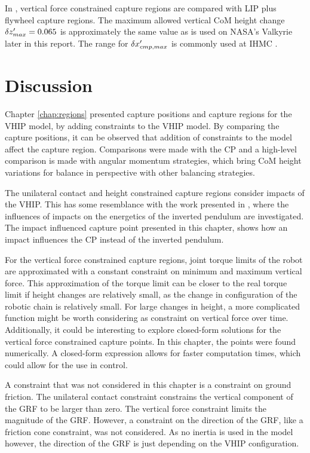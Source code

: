 In , vertical force constrained capture regions are compared with \ac{LIP} plus flywheel capture regions. The maximum allowed vertical \ac{CoM} height change $\delta z_{max}' =0.065$ is approximately the same value as is used on NASA's Valkyrie later in this report. The range for $\delta x_{cmp,max}'$ is commonly used at \ac{IHMC} \cite{griffin2017natural}.

\section{Discussion}
Chapter \ref{chap:regions} presented capture positions and capture regions for the \acf{VHIP} model, by adding constraints to the \ac{VHIP} model. By comparing the capture positions, it can be observed that addition of constraints to the model affect the capture region. Comparisons were made with the \ac{CP} and a high-level comparison is made with angular momentum strategies, which bring \ac{CoM} height variations for balance in perspective with other balancing strategies.

The unilateral contact and height constrained capture regions consider impacts of the \ac{VHIP}. This has some resemblance with the work presented in \cite{kuo2005energetic}, where the influences of impacts on the energetics of the inverted pendulum are investigated. The impact influenced capture point presented in this chapter, shows how an impact influences the \ac{CP} instead of the inverted pendulum.

For the vertical force constrained capture regions, joint torque limits of the robot are approximated with a constant constraint on minimum and maximum vertical force. This approximation of the torque limit can be closer to the real torque limit if height changes are relatively small, as the change in configuration of the robotic chain is relatively small. For large changes in height, a more complicated function might be worth considering as constraint on vertical force over time. Additionally, it could be interesting to explore closed-form solutions for the vertical force constrained capture points. In this chapter, the points were found numerically. A closed-form expression allows for faster computation times, which could allow for the use in control.

A constraint that was not considered in this chapter is a constraint on ground friction. The unilateral contact constraint constrains the vertical component of the \ac{GRF} to be larger than zero. The vertical force constraint limits the magnitude of the \ac{GRF}. However, a constraint on the direction of the \ac{GRF}, like a friction cone constraint, was not considered. As no inertia is used in the model however, the direction of the \ac{GRF} is just depending on the \ac{VHIP} configuration.

